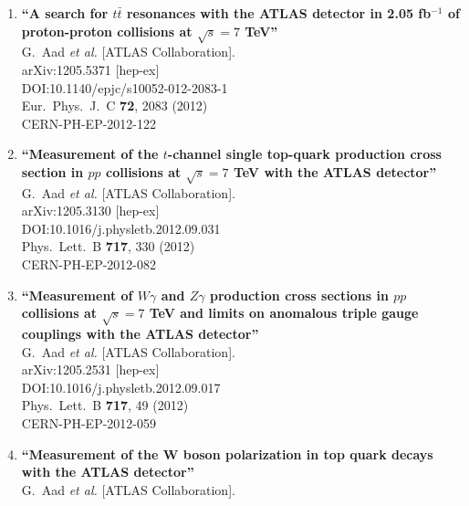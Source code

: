 \documentclass{article}
\begin{document}
\begin{enumerate}
\item%
{\bf ``A search for $t\bar{t}$ resonances with the ATLAS detector in 2.05 fb$^{-1}$ of proton-proton collisions at $\sqrt{s}=7$ TeV''}
  \\{}G.~Aad {\it et al.} [ATLAS Collaboration].
  \\{}arXiv:1205.5371 [hep-ex]
  \\{}DOI:10.1140/epjc/s10052-012-2083-1
  \\{}Eur.\ Phys.\ J.\ C {\bf 72}, 2083 (2012)
  \\{}CERN-PH-EP-2012-122
\item%
{\bf ``Measurement of the $t$-channel single top-quark production cross section in $pp$ collisions at $\sqrt{s}=7$ TeV with the ATLAS detector''}
  \\{}G.~Aad {\it et al.} [ATLAS Collaboration].
  \\{}arXiv:1205.3130 [hep-ex]
  \\{}DOI:10.1016/j.physletb.2012.09.031
  \\{}Phys.\ Lett.\ B {\bf 717}, 330 (2012)
  \\{}CERN-PH-EP-2012-082
\item%
{\bf ``Measurement of $W \gamma$ and $Z \gamma$ production cross sections in $pp$ collisions at $\sqrt{s}=7$ TeV and limits on anomalous triple gauge couplings with the ATLAS detector''}
  \\{}G.~Aad {\it et al.} [ATLAS Collaboration].
  \\{}arXiv:1205.2531 [hep-ex]
  \\{}DOI:10.1016/j.physletb.2012.09.017
  \\{}Phys.\ Lett.\ B {\bf 717}, 49 (2012)
  \\{}CERN-PH-EP-2012-059
\item%
{\bf ``Measurement of the W boson polarization in top quark decays with the ATLAS detector''}
  \\{}G.~Aad {\it et al.} [ATLAS Collaboration].

\end{enumerate}
\end{document}
